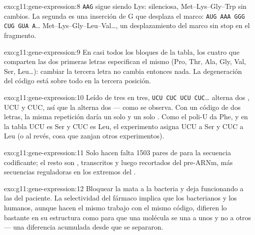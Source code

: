 \begin{solution}{exo:g11:gene-expression:8}
\texttt{AAG} sigue siendo Lys: silenciosa, Met--Lys--Gly--Trp sin
cambios. La segunda es una inserción de G que desplaza el marco:
\texttt{AUG AAA GGG CUG GUA A}\dots{} Met--Lys--Gly--Leu--Val\dots, un
desplazamiento del marco sin stop en el fragmento.
\end{solution}

\begin{solution}{exo:g11:gene-expression:9}
En casi todos los bloques de la tabla, los cuatro  que comparten
las dos primeras letras especifican el mismo  (Pro, Thr, Ala,
Gly, Val, Ser, Leu\dots): cambiar la tercera letra no cambia entonces
nada. La degeneración del código está sobre todo en la tercera
posición.
\end{solution}

\begin{solution}{exo:g11:gene-expression:10}
Leído de tres en tres, \texttt{UCU CUC UCU CUC}\dots{} alterna dos
, UCU y CUC, así que la  alterna dos  ---
como se observa. Con un código de dos letras, la misma repetición daría
un solo  y un solo . Como el poli-U da Phe, y en la
tabla UCU es Ser y CUC es Leu, el experimento asigna UCU a Ser y CUC a
Leu (o al revés, cosa que zanjan otros experimentos).
\end{solution}

\begin{solution}{exo:g11:gene-expression:11}
Solo hacen falta 1503 pares de  para la secuencia codificante; el
resto son , transcritos y luego recortados del pre-ARNm, más
secuencias reguladoras en los extremos del .
\end{solution}

\begin{solution}{exo:g11:gene-expression:12}
Bloquear la  mata a la bacteria y deja funcionando a las
 del paciente. La selectividad del fármaco implica que los
 bacterianos y los humanos, aunque hacen el mismo trabajo con
el mismo código, difieren lo bastante en su estructura como para que
una molécula se una a unos y no a otros --- una diferencia acumulada
desde que se separaron.
\end{solution}

